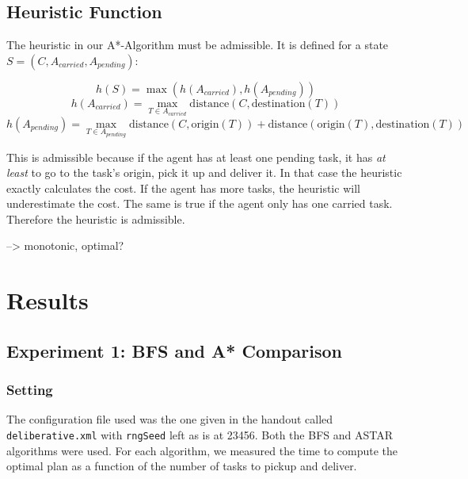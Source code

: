 \documentclass[11pt]{article}
\begin{document}
\subsection{Heuristic Function}
The heuristic in our A*-Algorithm must be admissible. It is defined for a state 
$S = (C, A_{carried}, A_{pending})$:

$$
h(S) = \max (h(A_{carried}), h(A_{pending})) 
$$$$
h(A_{carried}) = \max_{T \in A_{carried}} \text{distance}(C, \text{destination}(T))
$$$$
h(A_{pending}) = \max_{T \in A_{pending}} \text{distance}(C, \text{origin}(T)) + 
\text{distance}(\text{origin}(T), \text{destination}(T))
$$

This is admissible because if the agent has at least one pending task, it has \textit{at least}
to go to the task's origin, pick it up and deliver it. In that case the heuristic exactly 
calculates the cost. If the agent has more tasks, the heuristic will underestimate the cost. 
The same is true if the agent only has one carried task. Therefore the heuristic 
is admissible.

--> monotonic, optimal?


\section{Results}

\subsection{Experiment 1: BFS and A* Comparison}

\subsubsection{Setting}
The configuration file used was the one given in the handout called 
\texttt{deliberative.xml} with \texttt{rngSeed} left as is at 23456. 
Both the BFS and ASTAR algorithms were used. For each algorithm, 
we measured the time to compute the optimal plan as a function of the 
number of tasks to pickup and deliver.  
\end{document}
